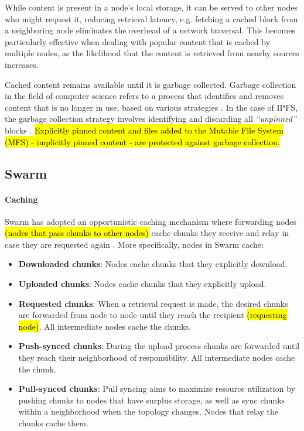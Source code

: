 While content is present in a node's local storage, it can be served to other nodes who might request it, reducing retrieval latency, e.g. fetching a cached block from a neighboring node eliminates the overhead of a network traversal. This becomes particularly effective when dealing with popular content that is cached by multiple nodes, as the likelihood that the content is retrieved from nearby sources increases.

Cached content remains available until it is garbage collected. Garbage collection in the field of computer science refers to a process that identifies and removes content that is no longer in use, based on various strategies \citep{gc_2023}. In the case of IPFS, the garbage collection strategy involves identifying and discarding all \emph{``unpinned''} blocks \citep{ipfs_docs_2}. \hl{Explicitly pinned content and files added to the Mutable File System (MFS) - implicitly pinned content - are protected against garbage collection.}

\subsection{Swarm}\label{subsection:swarm}
\paragraph{Caching}\label{par:caching_swarm}
Swarm has adopted an opportunistic caching mechanism where forwarding nodes \hl{(nodes that pass chunks to other nodes)} cache chunks they receive and relay in case they are requested again \citep[p.~47]{tron_2020}. More specifically, nodes in Swarm cache:

\begin{itemize}
    \item \textbf{Downloaded chunks}: Nodes cache chunks that they explicitly download.
    \item \textbf{Uploaded chunks}: Nodes cache chunks that they explicitly upload.
    \item \textbf{Requested chunks}: When a retrieval request is made, the desired chunks are forwarded from node to node until they reach the recipient \hl{(requesting node)}. All intermediate nodes cache the chunks.
    \item \textbf{Push-synced chunks}: During the upload process chunks are forwarded until they reach their neighborhood of responsibility. All intermediate nodes cache the chunk.
    \item \textbf{Pull-synced chunks}: Pull syncing aims to maximize resource utilization by pushing chunks to nodes that have surplus storage, as well as sync chunks within a neighborhood when the topology changes. Nodes that relay the chunks cache them.
\end{itemize} 

